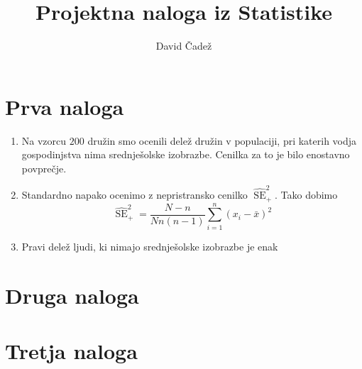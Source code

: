 \documentclass{article}
\title{Projektna naloga iz Statistike}
\author{David Čadež}
\date{}
\DeclareMathOperator{\se}{SE}
\begin{document}
\maketitle

\section{Prva naloga}

\begin{enumerate}[label=\alph*)]
    \item Na vzorcu $200$ družin smo ocenili delež družin v populaciji, pri
        katerih vodja gospodinjstva nima srednješolske izobrazbe. Cenilka za to
        je bilo enostavno povprečje.
    \item Standardno napako ocenimo z nepristransko cenilko $\widehat{\se}_+^2$.
        Tako dobimo
        \[
            \widehat{\se}_+^2 = \frac{N - n}{N n (n - 1)} \sum_{i=1}^{n} (x_i -
            \bar{x})^2
        \]

    \item Pravi delež ljudi, ki nimajo srednješolske izobrazbe je enak
\end{enumerate}

\section{Druga naloga}
\section{Tretja naloga}

\nocite{*}

{}
\end{document}
